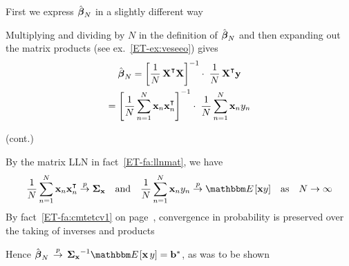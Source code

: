 \begin{frame}
        
    \vspace{2em}
    
    First we express $\hat {\boldsymbol \beta}_N$
    in a slightly different way
    
    Multiplying and dividing by $N$ in the
    definition of $\hat {\boldsymbol \beta}_N$ and then
    expanding out the matrix products 
    (see ex.~\ref{ET-ex:veseeo}) gives
    \begin{multline}
        \label{eq:seeo0}
        \hboldbeta_N 
        = \left[ \frac{1}{N} \, \boldX^\T\boldX \right]^{-1} 
                \cdot \; \frac{1}{N} \, \boldX^\T \boldy
        \\ = \left[ \frac{1}{N} \sum_{n=1}^N \boldx_n \boldx_n^\T \right]^{-1} 
            \cdot \; \frac{1}{N} \sum_{n=1}^N \boldx_n y_n
    \end{multline}
    
\end{frame}

\begin{frame}
        
    \vspace{2em}
    (cont.)
    
    By the matrix LLN in fact~\ref{ET-fa:llnmat}, we have
    \begin{equation*}
         \frac{1}{N} \sum_{n=1}^N \boldx_n \boldx_n^\T 
             \toprob \Sigmax
         \quad \text{and} \quad
        \frac{1}{N} \sum_{n=1}^N \boldx_n y_n
             \toprob \EE[\boldx y]
         \quad \text{as} \quad
         N \to \infty
    \end{equation*}
    By fact~\ref{ET-fa:cmtetcv1} on page~\pageref{ET-fa:cmtetcv1},
    convergence in probability is
    preserved over the taking of inverses and products
    
    Hence $\hboldbeta_N \, \toprob \, \Sigmax^{-1} \EE[\boldx \, y] = \boldb^*$, 
    as was to be shown
    \qedsymbol
    
\end{frame}

